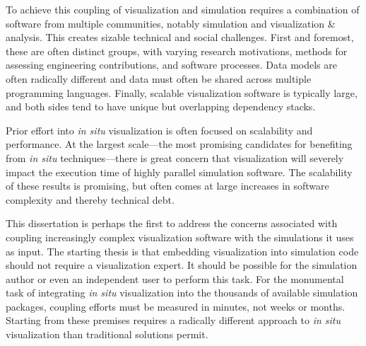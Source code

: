 To achieve this coupling of visualization and simulation requires a
combination of software from multiple communities, notably simulation
and visualization \& analysis.  This creates sizable technical and
social challenges.  First and foremost, these are often distinct
groups, with varying research motivations, methods for assessing
engineering contributions, and software processes.  Data models are
often radically different and data must often be shared across multiple
programming languages.  Finally, scalable visualization software is
typically large, and both sides tend to have unique but overlapping
dependency stacks.


Prior effort into \textit{in situ} visualization is often focused on
scalability and performance.  At the largest scale---the most promising
candidates for benefiting from \textit{in situ} techniques---there is
great concern that visualization will severely impact the execution
time of highly parallel simulation software.  The scalability of these
results is promising, but often comes at large increases in software
complexity and thereby technical debt.


This dissertation is perhaps the first to address the concerns
associated with coupling increasingly complex visualization software
with the simulations it uses as input.  The starting thesis is that
embedding visualization into simulation code should not require a
visualization expert.  It should be possible for the simulation author
or even an independent user to perform this task.  For the
monumental task of integrating \textit{in situ} visualization into the
thousands of available simulation packages, coupling efforts must be
measured in minutes, not weeks or months.  Starting from
these premises requires a radically different approach to \textit{in
situ} visualization than traditional solutions permit.


